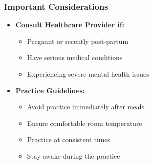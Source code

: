 \begin{frame}[fragile]\frametitle{Important Considerations}
    \begin{itemize}
        \item \textbf{Consult Healthcare Provider if:}
        \begin{itemize}
            \item Pregnant or recently post-partum
            \item Have serious medical conditions
            \item Experiencing severe mental health issues
        \end{itemize}
        \item \textbf{Practice Guidelines:}
        \begin{itemize}
            \item Avoid practice immediately after meals
            \item Ensure comfortable room temperature
            \item Practice at consistent times
            \item Stay awake during the practice
        \end{itemize}
    \end{itemize}
\end{frame}